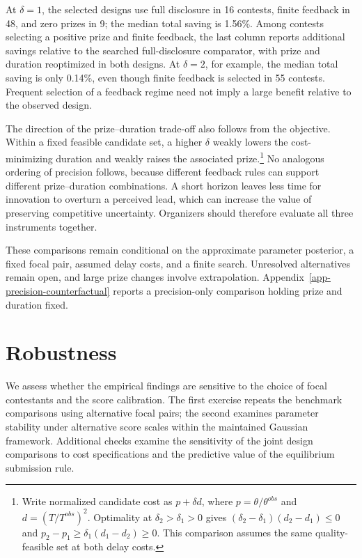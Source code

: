 \documentclass[mnsc]{informs3}
\begin{document}
At $\delta=1$, the selected designs use full disclosure in 16 contests, finite feedback in 48, and zero prizes in 9; the median total saving is 1.56\%. Among contests selecting a positive prize and finite feedback, the last column reports additional savings relative to the searched full-disclosure comparator, with prize and duration reoptimized in both designs. At $\delta=2$, for example, the median total saving is only 0.14\%, even though finite feedback is selected in 55 contests. Frequent selection of a feedback regime need not imply a large benefit relative to the observed design.

The direction of the prize--duration trade-off also follows from the objective. Within a fixed feasible candidate set, a higher $\delta$ weakly lowers the cost-minimizing duration and weakly raises the associated prize.\footnote{Write normalized candidate cost as $p+\delta d$, where $p=\theta/\theta^{obs}$ and $d=(T/T^{obs})^2$. Optimality at $\delta_2>\delta_1>0$ gives $(\delta_2-\delta_1)(d_2-d_1)\leq0$ and $p_2-p_1\geq\delta_1(d_1-d_2)\geq0$. This comparison assumes the same quality-feasible set at both delay costs.} No analogous ordering of precision follows, because different feedback rules can support different prize--duration combinations. A short horizon leaves less time for innovation to overturn a perceived lead, which can increase the value of preserving competitive uncertainty. Organizers should therefore evaluate all three instruments together.

These comparisons remain conditional on the approximate parameter posterior, a fixed focal pair, assumed delay costs, and a finite search. Unresolved alternatives remain open, and large prize changes involve extrapolation. Appendix~\ref{app-precision-counterfactual} reports a precision-only comparison holding prize and duration fixed.


\section{Robustness}

{We assess whether the empirical findings are sensitive to the choice of focal contestants and the score calibration. The first exercise repeats the benchmark comparisons using alternative focal pairs; the second examines parameter stability under alternative score scales within the maintained Gaussian framework. Additional checks examine the sensitivity of the joint design comparisons to cost specifications and the predictive value of the equilibrium submission rule.}
\end{document}

